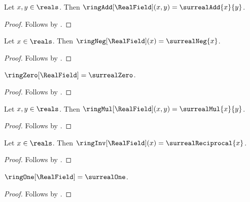 \begin{proposition}\label{surreal_real_field_addition}
    Let $x,y\in\reals$.
    Then $\ringAdd[\RealField](x,y)=\surrealAdd{x}{y}$.
\end{proposition}
\begin{proof}
    Follows by
    .
\end{proof}

\begin{proposition}\label{surreal_real_field_negation}
    Let $x\in\reals$.
    Then $\ringNeg[\RealField](x)=\surrealNeg{x}$.
\end{proposition}
\begin{proof}
    Follows by
    .
\end{proof}

\begin{proposition}\label{surreal_real_field_zero}
    $\ringZero[\RealField]=\surrealZero$.
\end{proposition}
\begin{proof}
    Follows by .
\end{proof}

\begin{proposition}\label{surreal_real_field_multiplication}
    Let $x,y\in\reals$.
    Then $\ringMul[\RealField](x,y)=\surrealMul{x}{y}$.
\end{proposition}
\begin{proof}
    Follows by
    .
\end{proof}

\begin{proposition}\label{surreal_real_field_inverse}
    Let $x\in\reals$.
    Then $\ringInv[\RealField](x)=\surrealReciprocal{x}$.
\end{proposition}
\begin{proof}
    Follows by
    .
\end{proof}

\begin{proposition}\label{surreal_real_field_one}
    $\ringOne[\RealField]=\surrealOne$.
\end{proposition}
\begin{proof}
    Follows by .
\end{proof}

